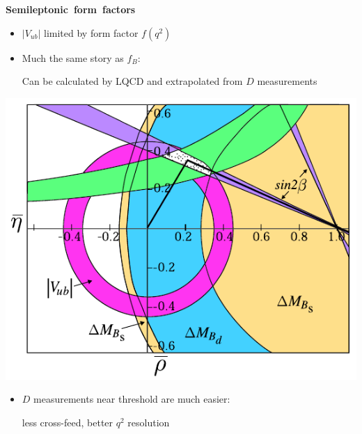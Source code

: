 \documentclass[landscape]{article}
\newenvironment{slide}[1][ ]{\mbox{\bf \boldmath #1 } \vfill}{\vfill \vspace{-1.5 cm} \mbox{ } \pagebreak}
\newenvironment{itemizer}[1]{\begin{itemize}\setlength{\itemsep}{#1}}{\end{itemize}}
\begin{document}
\begin{slide}[Semileptonic form factors]

\begin{minipage}{0.52\linewidth}
  \begin{itemizer}{1 cm}

  \item $|V_{ub}|$ limited by form factor $f(q^2)$

  \item Much the same story as $f_B$:

    \vspace{0.25 cm}
    Can be calculated by LQCD and \mbox{extrapolated} from $D$ measurements

  \end{itemizer}
\end{minipage} \hfill \begin{minipage}{0.4\linewidth}
  \includegraphics[width=\linewidth]{../ckm04}
\end{minipage}

\begin{itemizer}{1 cm}

  \item $D$ measurements near threshold are much easier:

    less cross-feed, better $q^2$ resolution

\end{itemizer}


\end{slide}
\end{document}
